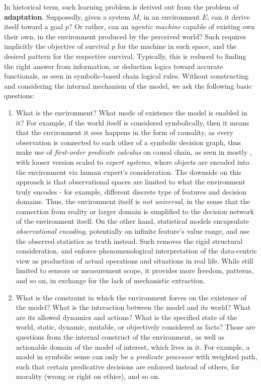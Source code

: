 In historical term, such learning problem is derived out from the problem of \textbf{adaptation}. Supposedly, given a system $M$, in an environment $E$, can it derive itself toward a goal $p$? Or rather, can an \textit{agentic machine} capable of existing own their own, in the environment produced by the perceived world? Such requires implicitly the objective of survival $p$ for the machine in such space, and the desired pattern for the respective survival. Typically, this is reduced to finding the right answer from information, or deduction logics toward accurate functionals, as seen in symbolic-based chain logical rules. Without constructing and considering the internal mechanism of the model, we ask the following basic questions: 
\begin{enumerate}[itemsep=1pt,topsep=1pt]
    \item What is the environment? What mode of existence the model is enabled in it? For example, if the world itself is considered symbolically, then it means that the environment it sees happens in the form of causality, as every observation is connected to each other of a symbolic decision graph, thus make use of \textit{first-order predicate calculus} on causal chain, as seen in mostly \cite{clocksin1996prolog,sterling1994art,norvig1992paradigms,brachman2004kr,jackson1985introduction,lucas1989principles,giarratano1998expert}, with looser version scaled to \textit{expert systems}, where objects are encoded into the environment via human expert's consideration. The downside on this approach is that observational spaces are limited to what the environment truly encodes - for example, different discrete type of features and decision domains. Thus, the environment itself is \textit{not universal}, in the sense that the connection from reality or larger domain is simplified to the decision network of the environment itself. On the other hand, statistical models encapsulate \textit{observational encoding}, potentially on infinite feature's value range, and use the observed statistics as truth instead. Such removes the rigid structural consideration, and enforce phenomenological interpretation of the data-centric view as production of actual operations and situations in real life. While still limited to sensors or measurement scope, it provides more freedom, patterns, and so on, in exchange for the lack of mechanistic extraction. 
    \item What is the constraint in which the environment forces on the existence of the model? What is the interaction between the model and its world? What are its allowed dynamics and actions? What is the specified state of the world, static, dynamic, mutable, or objectively considered as facts? Those are questions from the internal construct of the environment, as well as actionable domain of the model of interest, which lives in it. For example, a model in symbolic sense can only be a \textit{predicate processor} with weighted path, such that certain predicative decisions are enforced instead of others, for morality (wrong or right on ethics), and so on. 

\end{enumerate}
